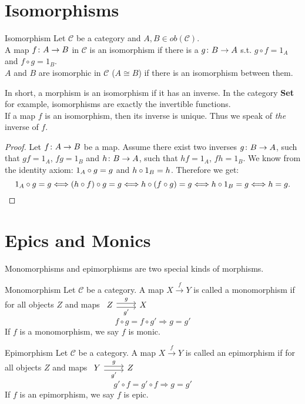 \section {Isomorphisms}
\begin{definition}{Isomorphism}
  Let $\mathscr{C}$ be a category and $A, B \in ob(\mathscr{C})$. \\
  A map $f \from A \to B$ in $\mathscr{C}$ is an isomorphism if there is a $g \from B \to A$ s.t. $g \circ f = 1_A$ and $f \circ g = 1_B$. \\
  $A$ and $B$ are isomorphic in $\mathscr{C}$ ($A \cong B$) if there is an isomorphism between them.
\end{definition}

In short, a morphism is an isomorphism if it has an inverse.
In the category \textbf{Set} for example,
isomorphisms are exactly the invertible functions.\\
If a map $f$ is an isomorphism, then its inverse is unique. Thus we speak of
\emph{the} inverse of $f$.

\begin{proof}
  Let $f \from A \to B$ be a map.
  Assume there exist two inverses $g \from B \to A$, such that $gf = 1_A$, $fg = 1_B$ and \mbox{$h \from B \to A$}, such that $hf = 1_A$, $fh = 1_B$.
  We know from the identity axiom: $1_A \mathbin{\circ} g = g$ and $h \mathbin{\circ} 1_B = h$. Therefore we get:
 \[  1_A \mathbin{\circ} g = g \Longleftrightarrow (h \mathbin{\circ} f) \mathbin{\circ} g = g \Longleftrightarrow h \mathbin{\circ} (f \mathbin{\circ} g) = g \Longleftrightarrow h \mathbin{\circ} 1_B = g \Longleftrightarrow h=g. \]
\end{proof}

\section {Epics and Monics}

Monomorphisms and epimorphisms are two special kinds of morphisms.

\begin{definition}{Monomorphism}
  Let $\mathscr{C}$ be a category. A map $X \overset{f}{\to} Y$ is called a monomorphism if for all objects $Z$ and maps
  $
  \begin{tikzcd}
    Z \arrow[r,shift left, "g"] \arrow[r,shift right,swap,"g'"] & X
  \end{tikzcd}
  $
  \[
    f \circ g = f \circ g' \Rightarrow g = g'
  \]
  If $f$ is a monomorphism, we say $f$ is monic.
\end{definition}

\begin{definition}{Epimorphism}
  Let $\mathscr{C}$ be a category. A map $X \overset{f}{\to} Y$ is called an epimorphism if for all objects $Z$ and maps
  $
  \begin{tikzcd}
    Y \arrow[r,shift left, "g"] \arrow[r,shift right,swap,"g'"] & Z
  \end{tikzcd}
  $
  \[
    g' \circ f = g' \circ f \Rightarrow g = g'
  \]
  If $f$ is an epimorphism, we say $f$ is epic.
\end{definition}

